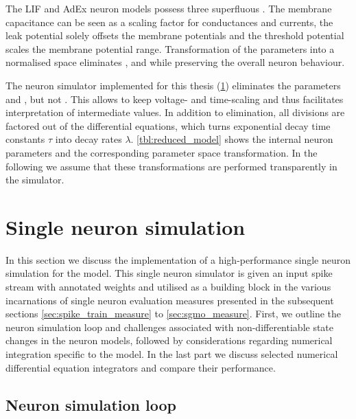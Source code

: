 The \acrshort{LIF} and \acrshort{AdEx} neuron models possess three superfluous \DoFs. The membrane capacitance \Cm can be seen as a scaling factor for conductances and currents, the leak potential \El solely offsets the membrane potentials and the threshold potential \ETh scales the membrane potential range. Transformation of the parameters into a normalised space eliminates \Cm, \El and \ETh while preserving the overall neuron behaviour.

The neuron simulator implemented for this thesis (\cref{sec:single_neuron_simulation}) eliminates the parameters \Cm and \El, but not \ETh. This allows to keep voltage- and time-scaling and thus facilitates interpretation of intermediate values. In addition to \DoF elimination, all divisions are factored out of the differential equations, which turns exponential decay time constants $\tau$ into decay rates $\lambda$. \cref{tbl:reduced_model} shows the internal neuron parameters and the corresponding parameter space transformation. In the following we assume that these transformations are performed transparently in the simulator.

\section{Single neuron simulation}
\label{sec:single_neuron_simulation}

In this section we discuss the implementation of a high-performance single neuron simulation for the \AdEx model. This single neuron simulator is given an input spike stream \tIn with annotated weights \wIn and utilised as a building block in the various incarnations of single neuron evaluation measures presented in the subsequent sections \ref{sec:spike_train_measure} to \ref{sec:sgmo_measure}. First, we outline the neuron simulation loop and challenges associated with non-differentiable state changes in the neuron models, followed by considerations regarding numerical integration specific to the \AdEx model. In the last part we discuss selected numerical differential equation integrators and compare their performance.

\subsection{Neuron simulation loop}
\label{sec:neuron_simulation_loop}

